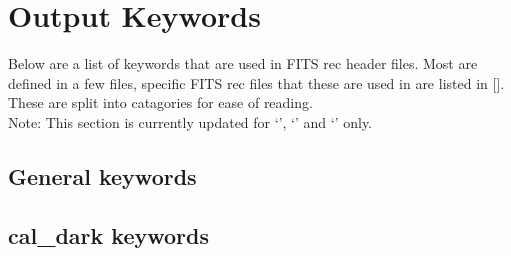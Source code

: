 \section{Output Keywords}
\label{section:the_keywords}




Below are a list of keywords that are used in FITS rec header files. Most are
defined in a few files, specific FITS rec files that these are used in are listed in []. These are split into catagories for ease of reading. \\

\noindent Note: This section is currently updated for `\caldark', `\calloc' and `\calslit' only.


\vspace{0.5cm}
\subsection{General keywords}


\vspace{0.5cm}
\subsection{cal\_dark keywords}






